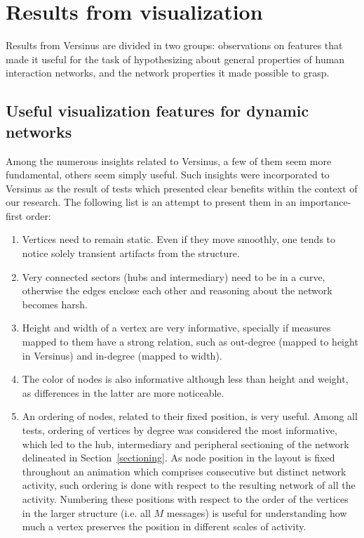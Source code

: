 \section{Results from visualization}
Results from Versinus are divided in two groups:
observations on features that made it useful for the task of hypothesizing about general properties of human interaction networks,
and the network properties it made possible to grasp.

\subsection{Useful visualization features for dynamic networks}

Among the numerous insights related to Versinus, a few of them seem more fundamental, others seem simply useful.
Such insights were incorporated to Versinus as the result of tests which presented clear benefits within the context of our research.
The following list is an attempt to present them in an importance-first order:
\begin{enumerate}
	\item Vertices need to remain static.
		Even if they move smoothly, one tends to notice solely transient artifacts from the structure.
	\item Very connected sectors (hubs and intermediary) need to be in a curve, otherwise the edges enclose each other and reasoning about the network becomes harsh.
	\item Height and width of a vertex are very informative, specially if measures mapped to them have a strong relation, such as out-degree (mapped to height in Versinus) and in-degree (mapped to width).
	\item The color of nodes is also informative although less than height and weight, as differences in the latter are more noticeable.
	\item An ordering of nodes, related to their fixed position, is very useful. Among all tests, ordering of vertices by degree was considered the most informative, which led to the hub, intermediary and peripheral sectioning of the network delineated in Section~\ref{sectioning}.
		As node position in the layout is fixed throughout an animation which comprises consecutive but distinct network activity, such ordering is done with respect to the resulting network of all the activity.
	Numbering these positions with respect to the order of the vertices in the larger structure (i.e. all $M$ messages) is useful for understanding how much a vertex preserves the position in different scales of activity.
\end{enumerate}

